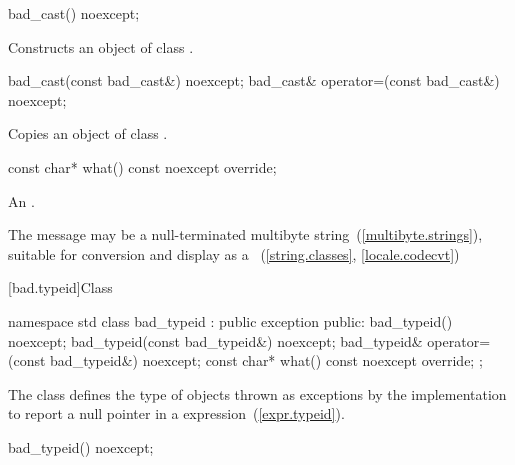 %
\begin{itemdecl}
bad_cast() noexcept;
\end{itemdecl}

\begin{itemdescr}
\pnum
\effects
Constructs an object of class
.
\end{itemdescr}

%
%
\begin{itemdecl}
bad_cast(const bad_cast&) noexcept;
bad_cast& operator=(const bad_cast&) noexcept;
\end{itemdecl}

\begin{itemdescr}
\pnum
\effects
Copies an object of class
.
\end{itemdescr}

%
%
\begin{itemdecl}
const char* what() const noexcept override;
\end{itemdecl}

\begin{itemdescr}
\pnum
\returns
An  \ntbs.

\pnum
\remarks
The message may be a null-terminated multibyte string~(\ref{multibyte.strings}),
suitable for conversion and display as a
~(\ref{string.classes}, \ref{locale.codecvt})
\end{itemdescr}

[bad.typeid]{Class }

%
\begin{codeblock}
namespace std {
  class bad_typeid : public exception {
  public:
    bad_typeid() noexcept;
    bad_typeid(const bad_typeid&) noexcept;
    bad_typeid& operator=(const bad_typeid&) noexcept;
    const char* what() const noexcept override;
  };
}
\end{codeblock}

\pnum
The class
defines the type of objects
thrown as exceptions by the implementation to report a null pointer
in a
expression~(\ref{expr.typeid}).

%
\begin{itemdecl}
bad_typeid() noexcept;
\end{itemdecl}


